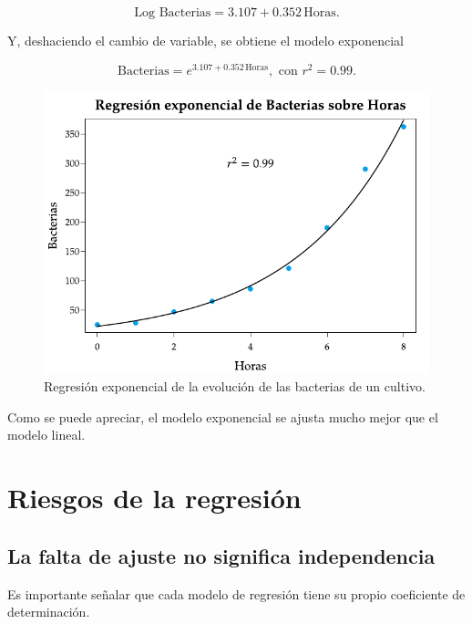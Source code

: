 \documentclass[
  a4paper,
]{scrreport}
\theoremstyle{plain}
\theoremstyle{definition}
\theoremstyle{definition}
\theoremstyle{remark}
\begin{document}
\[\mbox{Log Bacterias} = 3.107 + 0.352\, \mbox{Horas}.\]

Y, deshaciendo el cambio de variable, se obtiene el modelo exponencial

\[\mbox{Bacterias} = e^{3.107+0.352\,\mbox{Horas}}, \mbox{ con } r^2=0.99.\]

\begin{figure}[H]

{\centering \includegraphics{img/regresion/regresion_exponencial_bacterias.pdf}

}

\caption{Regresión exponencial de la evolución de las bacterias de un
cultivo.}

\end{figure}%

Como se puede apreciar, el modelo exponencial se ajusta mucho mejor que
el modelo lineal.

\section{Riesgos de la regresión}\label{riesgos-de-la-regresiuxf3n}

\subsection{La falta de ajuste no significa
independencia}\label{la-falta-de-ajuste-no-significa-independencia}

Es importante señalar que cada modelo de regresión tiene su propio
coeficiente de determinación.
\end{document}
